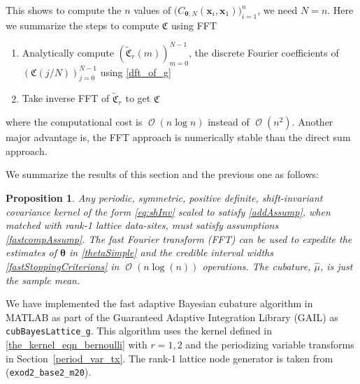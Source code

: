 \documentclass{iitthesis}          %
\DeclareMathOperator{\Order}{{\mathcal O}}
\newtheorem{prop}{Proposition}
\newcommand{\bm}[1]{\boldsymbol{#1}}
\newcommand{\vtheta}{{\bm{\theta}}}
\newcommand{\vx}{\bm{x}}
\newcommand{\hmu}{\widehat{\mu}}
\newcommand{\code}[1]{\texttt{#1}}
\newcommand\secref{Section~\ref}
\begin{document}
This shows to compute the $n$ values of $\biggl( C_{\vtheta, N}(\vx_i, \vx_1) \biggr)_{i=1}^n$, we need $N=n$. Here we summarize the steps to compute $\mathfrak{C}$ using FFT
\begin{enumerate}
\item Analytically compute $\left(\widetilde{\mathfrak{C}}_{r}(m)\right)_{m=0}^{N-1}$, the discrete Fourier coefficients of $(\mathfrak{C}(j/N))_{j=0}^{N-1}$ using \eqref{dft_of_g}
\item Take inverse FFT of $\widetilde{\mathfrak{C}}_{r}$ to get $\mathfrak{C}$
\end{enumerate}
where the computational cost is $\Order(n \log n)$ instead of $\Order(n^2)$. Another major advantage is, the FFT approach is numerically stable than the direct sum approach.


We summarize the results of this section and the previous one as follows:
\begin{prop}
Any periodic, symmetric, positive definite, shift-invariant covariance kernel of the form \eqref{eq:shInv} scaled to satisfy \eqref{addAssump}, when matched with rank-1 lattice data-sites, must satisfy assumptions \eqref{fastcompAssump}.  The \emph{fast Fourier transform} (FFT) can be used to expedite the estimates of $\vtheta$ in \eqref{thetaSimple} and the credible interval widths \eqref{fastStoppingCriterions} in $\Order(n \log(n))$ operations. The cubature, $\hmu$, is just the sample mean.
\end{prop}

We have implemented the fast adaptive Bayesian cubature algorithm in MATLAB as part of the Guaranteed Adaptive Integration Library (GAIL) \cite{ChoEtal17b} as \allowbreak \\ \code{cubBayesLattice\_g}. This algorithm uses the kernel defined in  \eqref{the_kernel_eqn_bernoulli} with  $r=1,2$ and the periodizing variable transforms in \secref{period_var_tx}. The rank-1 lattice node generator is taken from \cite{NuyMagic} (\code{exod2\_base2\_m20}).












\label{period_var_tx}
\end{document}
